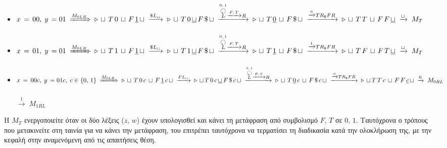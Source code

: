 \begin{itemize}
	\itemsep0em
	\item $x\,=\,00,\; y\,=01 \;\xRightarrow{M_{0LR}}\;
	\triangleright\, \sqcup\, T\, 0\, \sqcup\, F\, \underline{1}\, \sqcup\; \xrightarrow{\$L_\sqcup}\;
	\triangleright\, \sqcup\, T\, 0\, \underline{\sqcup}\, F\, \$\, \sqcup\;
	\xrightarrow{\overset{0,\,1}{\overset{\botcircleleft}{L}}\xrightarrow{F,\,T}R}\;
	\triangleright\, \sqcup\, T\, \underline{0}\, \sqcup\, F\, \$\, \sqcup\; \xrightarrow{\xrightarrow{0}TR_\$FR}\;
	\triangleright\, \sqcup\, T\, T\, \sqcup\, F\, F\, \underline{\sqcup}\;\xrightarrow{\sqcup}\; M_T
	\quad$ \textcolor{green}{}

	\item $x\,=\,01,\; y\,=01 \;\xRightarrow{M_{0LR}}\;
	\triangleright\, \sqcup\, T\, 1\, \sqcup\, F\, \underline{1}\, \sqcup\; \xrightarrow{\$L_\sqcup}\;
	\triangleright\, \sqcup\, T\, 1\, \underline{\sqcup}\, F\, \$\, \sqcup\;
	\xrightarrow{\overset{0,\,1}{\overset{\botcircleleft}{L}}\xrightarrow{F,\,T}R}\;
	\triangleright\, \sqcup\, T\, \underline{1}\, \sqcup\, F\, \$\, \sqcup\; \xrightarrow{\xrightarrow{1}TR_\$FR}\;
	\triangleright\, \sqcup\, T\, F\, \sqcup\, F\, T\, \underline{\sqcup}\;\xrightarrow{\sqcup}\; M_T
	\quad$ \textcolor{green}{}

	\item $x\,=\,00c,\; y\,=01c,\; c\in\{0,\,1\} \;\xRightarrow{M_{0LR}}\;
	\triangleright\, \sqcup\, T\, 0\, c\, \sqcup\, F\, \underline{1}\, c\, \sqcup\; \xrightarrow{FL_\sqcup}\;
	\\ \triangleright\, \sqcup\, T\, 0\, c\, \underline{\sqcup}\, F\, \$\, c\, \sqcup\;
	\xrightarrow{\overset{0,\,1}{\overset{\botcircleleft}{L}}\xrightarrow{F,\,T}R}\;
	\triangleright\, \sqcup\, T\, \underline{0}\, c\, \sqcup\, F\, \$\, c\, \sqcup\;
	\xrightarrow{\xrightarrow{0}TR_\$FR}\;\\
	\triangleright\, \sqcup\, T\, T\, c\, \sqcup\, F\, F\, \underline{c}\, \sqcup\; \xrightarrow{0}\; M_{0RL}
	\quad$ \textcolor{green}{}\\
	\makebox[3.7cm]{\hfill}$\xrightarrow{1}\; M_{1RL} \quad$ \textcolor{green}{}
\end{itemize}

\par H $M_T$ ενεργοποιείτε όταν οι δύο λέξεις ($z,\,w$) έχουν υπολογισθεί και κάνει τη μετάφραση από συμβολισμό
$F,\,T$ σε $0,\,1$. Ταυτόχρονα ο τρόπους που μετακινείτε στη ταινία για να κάνει την μετάφραση, του επιτρέπει
ταυτόχρονα να τερματίσει τη διαδικασία κατά την ολοκλήρωση της, με την κεφαλή στην αναμενόμενη από τις απαιτήσεις
θέση.

